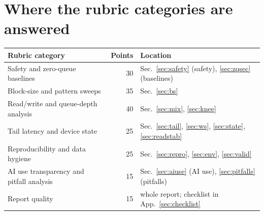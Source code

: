 \documentclass{article}
\begin{document}
\section{Where the rubric categories are answered}\label{sec:rubric}
\begin{center}\small
\begin{tabular}{p{6.0cm}rp{7.6cm}}
\toprule
\textbf{Rubric category} & \textbf{Points} & \textbf{Location} \\
\midrule
Safety and zero-queue baselines & 30 & Sec.~\ref{sec:safety} (safety), \ref{sec:zqsec} (baselines) \\
Block-size and pattern sweeps & 35 & Sec.~\ref{sec:bs} \\
Read/write and queue-depth analysis & 40 & Sec.~\ref{sec:mix}, \ref{sec:knee} \\
Tail latency and device state & 25 & Sec.~\ref{sec:tail}, \ref{sec:ws}, \ref{sec:state}, \ref{sec:readstab} \\
Reproducibility and data hygiene & 25 & Sec.~\ref{sec:repro}, \ref{sec:env}, \ref{sec:valid} \\
AI use transparency and pitfall analysis & 15 & Sec.~\ref{sec:aiuse} (AI use), \ref{sec:pitfalls} (pitfalls) \\
Report quality & 15 & whole report; checklist in App.~\ref{sec:checklist} \\
\bottomrule
\end{tabular}
\end{center}
\end{document}
